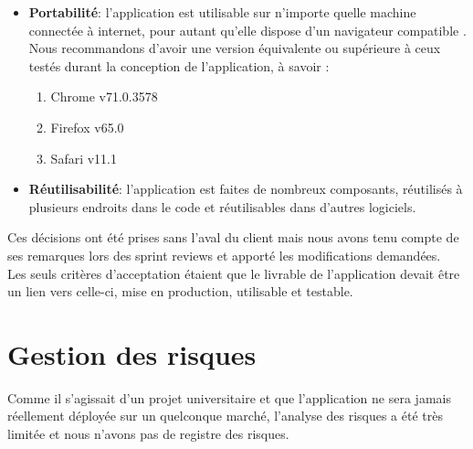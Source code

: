 \documentclass[t, 12pt, usenames,dvipsnames]{article}
\begin{document}
\begin{itemize}
            \item \textbf{Portabilité}: l'application est utilisable sur n'importe quelle machine connectée à internet, pour autant qu'elle dispose d'un navigateur compatible . Nous recommandons d'avoir une version équivalente ou supérieure à ceux testés durant la conception de l'application, à savoir : 
                \begin{enumerate}
                    \item Chrome v71.0.3578
                    \item Firefox v65.0
                    \item Safari v11.1
                \end{enumerate}
            \newpage
            \item \textbf{Réutilisabilité}: l'application est faites de nombreux composants, réutilisés à plusieurs endroits dans le code et réutilisables dans d'autres logiciels.
        \end{itemize}
        
        \noindent Ces décisions ont été prises sans l'aval du client mais nous avons tenu compte de ses remarques lors des sprint reviews et apporté les modifications demandées.\\
        Les seuls critères d'acceptation étaient que le livrable de l'application devait être un lien vers celle-ci, mise en production, utilisable et testable.
        
    

    \newpage

    \section{Gestion des risques}
    \noindent Comme il s'agissait d'un projet universitaire et que l'application ne sera jamais réellement déployée sur un quelconque marché, l'analyse des risques a été très limitée et nous n'avons pas de registre des risques.
    
\end{document}
